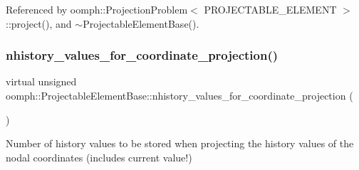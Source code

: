 Referenced by oomph\+::\+Projection\+Problem$<$ P\+R\+O\+J\+E\+C\+T\+A\+B\+L\+E\+\_\+\+E\+L\+E\+M\+E\+N\+T $>$\+::project(), and $\sim$\+Projectable\+Element\+Base().

\mbox{\label{classoomph_1_1ProjectableElementBase_ab4ecd0cd24000a3ed675dc7198203c1f}} 
\subsubsection{\texorpdfstring{nhistory\+\_\+values\+\_\+for\+\_\+coordinate\+\_\+projection()}{nhistory\_values\_for\_coordinate\_projection()}}
{\footnotesize\ttfamily virtual unsigned oomph\+::\+Projectable\+Element\+Base\+::nhistory\+\_\+values\+\_\+for\+\_\+coordinate\+\_\+projection (\begin{DoxyParamCaption}{ }\end{DoxyParamCaption})\hspace{0.3cm}{\ttfamily [pure virtual]}}



Number of history values to be stored when projecting the history values of the nodal coordinates (includes current value!) 



